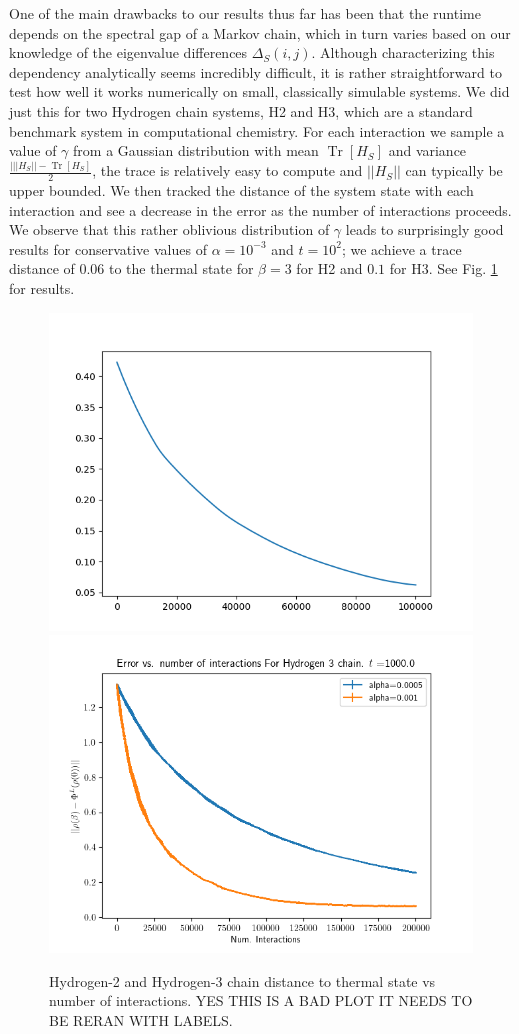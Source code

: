 \documentclass{article}
\newcommand{\brackets}[1]{\left[ #1 \right]}
\newcommand{\norm}[1]{\left| \left| #1 \right| \right|}
\DeclareMathOperator{\Tr}{Tr}
\newcommand{\trace}[1]{\Tr \brackets{ #1 }}
\begin{document}
One of the main drawbacks to our results thus far has been that the runtime depends on the spectral gap of a Markov chain, which in turn varies based on our knowledge of the eigenvalue differences $\Delta_S(i,j)$. Although characterizing this dependency analytically seems incredibly difficult, it is rather straightforward to test how well it works numerically on small, classically simulable systems. We did just this for two Hydrogen chain systems, H2 and H3, which are a standard benchmark system in computational chemistry. For each interaction we sample a value of $\gamma$ from a Gaussian distribution with mean $\trace{H_S}$ and variance $\frac{|\norm{H_S} - \trace{H_S}}{2}$, the trace is relatively easy to compute and $\norm{H_S}$ can typically be upper bounded. We then tracked the distance of the system state with each interaction and see a decrease in the error as the number of interactions proceeds. We observe that this rather oblivious distribution of $\gamma$ leads to surprisingly good results for conservative values of $\alpha = 10^{-3}$ and $t = 10^2$; we achieve a trace distance of 0.06 to the thermal state for $\beta = 3$ for H2 and $0.1$ for H3. See Fig. \ref{fig:h_chain_error} for results.
\begin{figure}
    \centering
    \includegraphics[width=0.45\linewidth]{numerics/data/h2_chain_2.png}
    \includegraphics[width = 0.45\linewidth]{numerics/data/h3_chain_7.png}
    \caption{Hydrogen-2 and Hydrogen-3 chain distance to thermal state vs number of interactions. YES THIS IS A BAD PLOT IT NEEDS TO BE RERAN WITH LABELS.}
    \label{fig:h_chain_error}
\end{figure}
\end{document}
